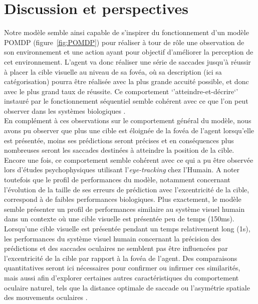 
\chapter{Discussion et perspectives} %

\label{Discussion} %

Notre modèle semble ainsi capable de s'inspirer du fonctionnement d'un modèle POMDP (figure~\ref{fig:POMDP}) pour réaliser à tour de rôle une observation de son environnement et une action ayant pour objectif d'améliorer la perception de cet environnement.
L'agent va donc réaliser une série de saccades jusqu'à réussir à placer la cible visuelle au niveau de sa fovéa, où sa description (ici sa catégorisation) pourra être réalisée avec la plus grande accuité possible, et donc avec le plus grand taux de réussite. Ce comportement `'atteindre-et-décrire`' instauré par le fonctionnement séquentiel semble cohérent avec ce que l'on peut observer dans les systèmes biologiques \autocite{Najemnik2005, Werner2014}. \\
En complément à ces observations sur le comportement général du modèle, nous avons pu observer que plus une cible est éloignée de la fovéa de l'agent lorsqu'elle est présentée, moins ses prédictions seront précises et en conséquences plus nombreuses seront les saccades destinées à atteindre la position de la cible. 
Encore une fois, ce comportement semble cohérent avec ce qui a pu être observée lors d'études psychophysiques utilisant l'\textit{eye-tracking} chez l'Humain. 
A noter toutefois que le profil de performances du modèle, notamment concernant l'évolution de la taille de ses erreurs de prédiction avec l'excentricité de la cible, correspond à de faibles performances biologiques. 
Plus exactement, le modèle semble présenter un profil de performances similaire au système visuel humain dans un contexte où une cible visuelle est présentée peu de temps (150ms). Lorsqu'une cible visuelle est présentée pendant un temps relativement long (1s), les performances du système visuel humain concernant la précision des prédictions et des saccades oculaires ne semblent pas être influencées par l'excentricité de la cible par rapport à la fovéa de l'agent. Des comparaisons quantitatives seront ici nécessaires pour confirmer ou infirmer ces similarités, mais aussi afin d'explorer certaines autres caractéristiques du comportement oculaire naturel, tels que la distance optimale de saccade ou l'asymétrie spatiale des mouvements oculaires \autocite{Najemnik2005, Uddin2004}.\\

